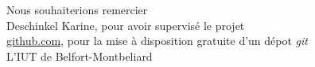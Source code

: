\begin{center}
\vspace{8\baselineskip}
Nous souhaiterions remercier\\
\vspace*{2\baselineskip}
Deschinkel Karine, pour avoir supervisé le projet\\
\vspace{1\baselineskip}
\url{github.com}, pour la mise à disposition gratuite d'un dépot \emph{git}\\
\vspace{1\baselineskip}
L'IUT de Belfort-Montbeliard\\


\end{center}
